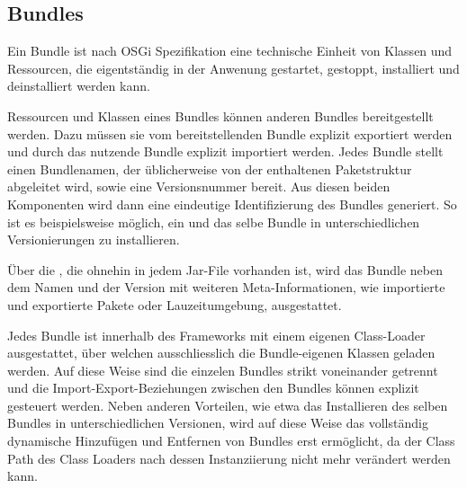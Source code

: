 \subsection{Bundles}
Ein Bundle ist nach OSGi Spezifikation\citep{osgi_2009} eine technische Einheit
von Klassen und Ressourcen, die eigentständig in der Anwenung gestartet,
gestoppt, installiert und deinstalliert werden kann.

Ressourcen und Klassen eines Bundles können anderen Bundles bereitgestellt
werden. Dazu müssen sie vom bereitstellenden Bundle explizit exportiert werden
und durch das nutzende Bundle explizit importiert werden. Jedes Bundle stellt einen
Bundlenamen, der üblicherweise von der enthaltenen Paketstruktur
abgeleitet wird, sowie eine Versionsnummer bereit. Aus diesen beiden Komponenten
wird dann eine eindeutige Identifizierung des Bundles generiert.
So ist es beispielsweise möglich, ein und das selbe Bundle in unterschiedlichen
Versionierungen zu installieren.

Über die , die ohnehin in jedem Jar-File vorhanden ist, wird
das Bundle neben dem Namen und der Version mit weiteren Meta-Informationen, wie
importierte und exportierte Pakete oder Lauzeitumgebung, ausgestattet.

Jedes Bundle ist innerhalb des Frameworks mit einem eigenen Class-Loader
ausgestattet, über welchen ausschliesslich die Bundle-eigenen Klassen geladen
werden. Auf diese Weise sind die einzelen Bundles strikt voneinander getrennt und die
Import-Export-Beziehungen zwischen den Bundles können explizit gesteuert
werden. 
Neben anderen Vorteilen, wie etwa das Installieren des selben Bundles in
unterschiedlichen Versionen, wird auf diese Weise das vollständig
dynamische Hinzufügen und Entfernen von Bundles erst ermöglicht, da der
Class Path des Class Loaders nach dessen Instanziierung nicht mehr verändert
werden kann.
\citep{wtherich_die_2008}
